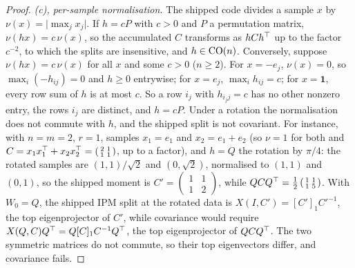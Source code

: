 \begin{proof}
\emph{(c), per-sample normalisation.} The shipped code divides a sample $x$ by $\nu(x)=\lvert\max_jx_j\rvert$. If $h=cP$ with $c>0$
and $P$ a permutation matrix, $\nu(hx)=c\,\nu(x)$, so the accumulated $C$ transforms as $hCh^{\top}$ up to the factor $c^{-2}$, to which
the splits are insensitive, and $h\in\mathrm{CO}(n)$. Conversely, suppose $\nu(hx)=c\,\nu(x)$ for all $x$ and some $c>0$ ($n\ge2$). For
$x=-e_j$, $\nu(x)=0$, so $\max_i(-h_{ij})=0$ and $h\ge0$ entrywise; for $x=e_j$, $\max_ih_{ij}=c$; for $x=\mathbf 1$, every row sum of
$h$ is at most $c$. So a row $i_j$ with $h_{i_jj}=c$ has no other nonzero entry, the rows $i_j$ are distinct, and $h=cP$. Under a
rotation the normalisation does not commute with $h$, and the shipped split is not covariant. For instance, with $n=m=2$, $r=1$,
samples $x_1=e_1$ and $x_2=e_1+e_2$ (so $\nu=1$ for both and $C=x_1x_1^{\top}+x_2x_2^{\top}=\left(\begin{smallmatrix}2&1\\1&1\end{smallmatrix}
\right)$, up to a factor), and $h=Q$ the rotation by $\pi/4$: the rotated samples are $(1,1)/\sqrt2$ and $(0,\sqrt2)$, normalised to
$(1,1)$ and $(0,1)$, so the shipped moment is $C'=\left(\begin{smallmatrix}1&1\\1&2\end{smallmatrix}\right)$, while
$QCQ^{\top}=\tfrac12\left(\begin{smallmatrix}1&1\\1&5\end{smallmatrix}\right)$. With $W_0=Q$, the shipped IPM split at the rotated data
is $X(I,C')=[C']_1C'^{-1}$, the top eigenprojector of $C'$, while covariance would require $X(Q,C)Q^{\top}=Q[C]_1C^{-1}Q^{\top}$, the top
eigenprojector of $QCQ^{\top}$. The two symmetric matrices do not commute, so their top eigenvectors differ, and covariance fails.
\end{proof}
